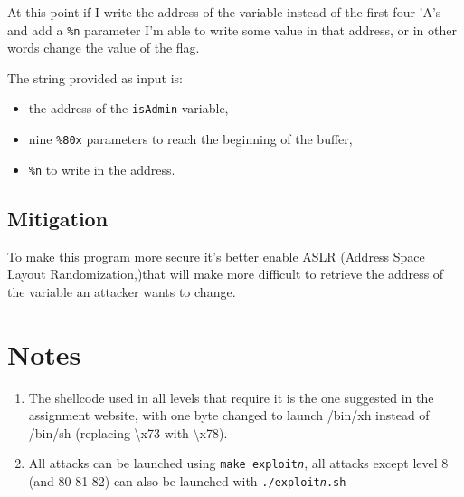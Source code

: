 \documentclass[a4paper,12pt]{article}
\begin{document}
At this point if I write the address of the variable instead of the first four 'A's and add a \texttt{\%n} parameter I'm able to write some value in that address, or in other words change the value of the flag.

The string provided as input is:
\begin{itemize}
\item the address of the \texttt{isAdmin} variable,
\item nine \texttt{\%80x} parameters to reach the beginning of the buffer,
\item \texttt{\%n} to write in the address.
\end{itemize}


\subsection{Mitigation}


To make this program more secure it's better enable ASLR (Address Space Layout Randomization,)that will make more difficult to retrieve the address of the variable an attacker wants to change. 


\section{Notes}
\begin{enumerate}


\item The shellcode used in all levels that require it is the one suggested in the assignment website, with one byte changed to launch /bin/xh instead of /bin/sh (replacing \textbackslash x73 with \textbackslash x78).


\item All attacks can be launched using \texttt{make exploit\textit{n}}, all attacks except level 8 (and 80 81 82) can also be launched with \texttt{./exploit\textit{n}.sh}
\end{enumerate}
\end{document}
